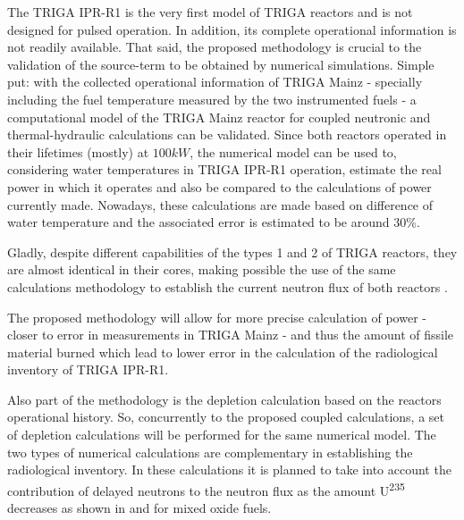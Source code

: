\documentclass[11pt]{article} %
\begin{document}
The TRIGA IPR-R1 is the very first model of TRIGA reactors and is not designed for pulsed operation. In addition, its complete operational information is not readily available. That said, the proposed methodology is crucial to the validation of the source-term to be obtained by numerical simulations. Simple put: with the collected operational information of TRIGA Mainz - specially including the fuel temperature measured by the two instrumented fuels - a computational model of the TRIGA Mainz reactor for coupled neutronic and thermal-hydraulic calculations can be validated. Since both reactors operated in their lifetimes (mostly) at $100 kW$, the numerical model can be used to, considering water temperatures in TRIGA IPR-R1 operation, estimate the real power in which it operates and also be compared to the calculations of power currently made. Nowadays, these calculations are made based on difference of water temperature and the associated error is estimated to be around 30\%.

Gladly, despite different capabilities of the types 1 and 2 of TRIGA reactors, they are almost identical in their cores, making possible the use of the same calculations methodology to establish the current neutron flux of both reactors \cite[p. 58]{IAEA_TECDOC_1970}.

The proposed methodology will allow for more precise calculation of power - closer to error in measurements in TRIGA Mainz - and thus the amount of fissile material burned which lead to lower error in the calculation of the radiological inventory of TRIGA IPR-R1.

Also part of the methodology \cite[p. 97]{Neutronics_CEA-e-DEN_2015} is the depletion calculation based on the reactors operational history. So, concurrently to the proposed coupled calculations, a set of depletion calculations will be performed for the same numerical model. The two types of numerical calculations are complementary in establishing the radiological inventory. In these calculations it is planned to take into account the contribution of delayed neutrons to the neutron flux as the amount U\textsuperscript{235} decreases as shown in \cite{Carvalho_2024} and \cite{Carvalho_2025} for mixed oxide fuels.

\end{document}
